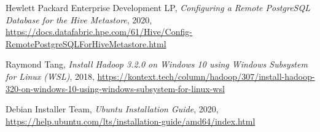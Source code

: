 \documentclass{article}
\begin{document}
\newpage
\begin{thebibliography}{9}
    Hewlett Packard Enterprise Development LP,
    \textit{Configuring a Remote PostgreSQL Database for the Hive Metastore},
    2020,
    \url{https://docs.datafabric.hpe.com/61/Hive/Config-RemotePostgreSQLForHiveMetastore.html}
    
    Raymond Tang,
    \textit{Install Hadoop 3.2.0 on Windows 10 using Windows Subsystem for Linux (WSL)},
    2018,
    \url{https://kontext.tech/column/hadoop/307/install-hadoop-320-on-windows-10-using-windows-subsystem-for-linux-wsl}

    Debian Installer Team,
    \textit{Ubuntu Installation Guide},
    2020,
    \url{https://help.ubuntu.com/lts/installation-guide/amd64/index.html}
\end{thebibliography}
\end{document}
